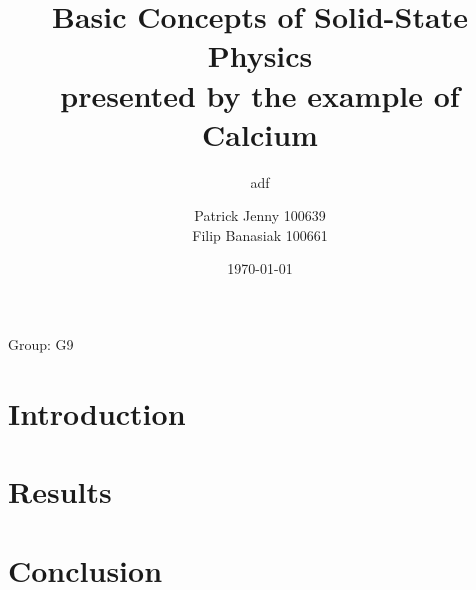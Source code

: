 \documentclass{report_class}
\title{Basic Concepts of Solid-State Physics\\presented by the example of Calcium}
\subtitle{adf}
\author{Patrick Jenny 100639\\Filip Banasiak 100661}
\date{\today}
\begin{document}
	\maketitle
	\centerline{Group: G9}
	
	\tableofcontents
	\newpage
	
	
	\newpage

	\clearpage
	
	\section{Introduction}
	
	\newpage

	\section{Results}
		
		\newpage

		
		\newpage

		
		\newpage

	\section{Conclusion}
	
	\newpage

	
	\newpage


	\listoftables
	\listoffigures
\end{document}
